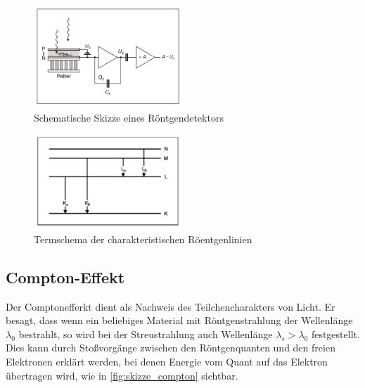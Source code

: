 \documentclass[12pt,english,ngerman]{scrartcl}
\begin{document}

\begin{figure}[H]
	\begin{center}
		\includegraphics[width =0.5\textwidth]{./figures/skizze_roentgendetektor.PNG}
	\end{center}
	\caption[Schematische Skizze eines Röntgendetektors]
	{Schematische Skizze eines Röntgendetektors
	\cite{unterlagen_rontgenfluorenzenz}
	}\label{fig:skizze_roetgendetektor}
\end{figure}


\begin{figure}[H]
	\begin{center}
		\includegraphics[width =0.5\textwidth]{./figures/termschema_roentgenlinien.PNG}
	\end{center}
	\caption[Termschema der charakteristischen Röentgenlinien]
	{Termschema der charakteristischen Röentgenlinien
	\cite{unterlagen_rontgenfluorenzenz}
	}\label{fig:termschema_roentgenlinien}
\end{figure}

\subsection{Compton-Effekt}

Der Comptonefferkt dient als Nachweis des Teilchencharakters von Licht. Er besagt, dass wenn
ein beliebiges Material mit Röntgenstrahlung der Wellenlänge $\lambda_0$ bestrahlt, so wird bei der
Streustrahlung auch Wellenlänge $\lambda_s > \lambda_0$ festgestellt.
Dies kann durch Stoßvorgänge zwischen den Röntgenquanten und den freien Elektronen erklärt werden,
bei denen Energie vom Quant auf das Elektron übertragen wird, wie in \autoref{fig:skizze_compton} sichtbar.
\end{document}
